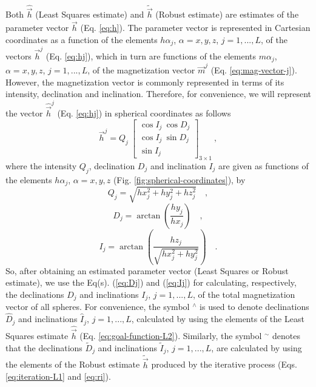 \documentclass[journal abbreviation, npg]{copernicus}
\begin{document}
Both $\hat{\vec{h}}$ (Least Squares estimate) and $\tilde{\vec{h}}$ (Robust estimate) are estimates of the parameter vector $\vec{h}$ (Eq. \ref{eq:h}). The parameter vector is represented in Cartesian coordinates as a function of the elements $h\alpha_{j}$, $\alpha = x, y, z$, $j = 1, ..., L$, of the vectors $\vec{h}^{j}$ (Eq. \ref{eq:hj}), which in turn are functions of the elements $m\alpha_{j}$, $\alpha = x, y, z$, $j = 1, ..., L$, of the magnetization vector $\vec{m}^{j}$ (Eq. \ref{eq:mag-vector-j}). However, the magnetization vector is commonly represented in terms of its intensity, declination and inclination. Therefore, for convenience, we will represent the vector $\hat{\vec{h}}^{j}$ (Eq. \ref{eq:hj}) in spherical coordinates as follows
\begin{equation}
\vec{h}^{j} = Q_{j} \:
\left[
\begin{array}{c}
\cos I_{j} \: \cos D_{j} \\
\cos I_{j} \: \sin D_{j} \\
\sin I_{j}
\end{array}
\right]_{3 \times 1} \: ,
\label{eq:hj-spheric}
\end{equation}
where the intensity $Q_{j}$, declination $D_{j}$ and inclination $I_{j}$ are given as functions of the elements $h\alpha_{j}$, $\alpha = x, y, z$ (Fig. \ref{fig:spherical-coordinates}), by
\begin{equation}
Q_{j} = \sqrt{hx_{j}^{2} + hy_{j}^{2} + hz_{j}^{2}} \quad ,
\label{eq:Qj}
\end{equation}
\begin{equation}
D_{j} = \arctan \left( \dfrac{hy_{j}}{hx_{j}} \right) \quad ,
\label{eq:Dj}
\end{equation}
\begin{equation}
I_{j} = \arctan \left( \dfrac{hz_{j}}{\sqrt{hx_{j}^{2} + hy_{j}^{2}}} \right) \quad .
\label{eq:Ij}
\end{equation}
So, after obtaining an estimated parameter vector (Least Squares or Robust estimate), we use the Eq(s). (\ref{eq:Dj}) and (\ref{eq:Ij}) for calculating, respectively, the declinations $D_{j}$ and inclinations $I_{j}$, $j = 1, ..., L$, of the total magnetization vector of all spheres. For convenience, the symbol $^\wedge$ is used to denote declinations $\hat{D}_{j}$ and inclinations $\hat{I}_{j}$, $j = 1, ..., L$, calculated by using the elements of the Least Squares estimate $\hat{\vec{h}}$ (Eq. \ref{eq:goal-function-L2}). Similarly, the symbol $^\sim$ denotes that the declinations $\tilde{D}_{j}$ and inclinations $\tilde{I}_{j}$, $j = 1, ..., L$, are calculated by using the elements of the Robust estimate $\tilde{\vec{h}}$ produced by the iterative process (Eqs. \ref{eq:iteration-L1} and \ref{eq:ri}).
\end{document}

